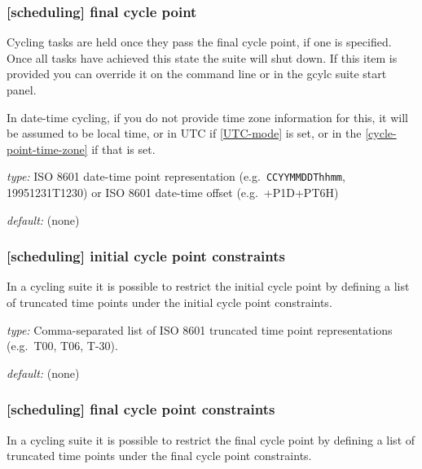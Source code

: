 \subsubsection[final cycle point]{[scheduling] \textrightarrow final cycle point}

Cycling tasks are held once they pass the final cycle point, if one is
specified. Once all tasks have achieved this state the suite will shut
down. If this item is provided you can override it on the command line
or in the gcylc suite start panel.

In date-time cycling, if you do not provide time zone information for this,
it will be assumed to be local time, or in UTC if \ref{UTC-mode} is set, or in
the \ref{cycle-point-time-zone} if that is set.

\begin{myitemize}
    \item {\em type:} ISO 8601 date-time point representation (e.g.\ 
 \lstinline=CCYYMMDDThhmm=, 19951231T1230) or ISO 8601 date-time offset
    (e.g.\  +P1D+PT6H)
    \item {\em default:} (none)
\end{myitemize}

\subsubsection[initial cycle point constraints]{[scheduling] \textrightarrow initial cycle point constraints}
\label{initial cycle point constraints}

In a cycling suite it is possible to restrict the initial cycle point by
defining a list of truncated time points under the initial cycle point
constraints.

\begin{myitemize}
    \item {\em type:} Comma-separated list of ISO 8601 truncated time point
        representations (e.g.\  T00, T06, T-30).
    \item {\em default:} (none)
\end{myitemize}

\subsubsection[final cycle point constraints]{[scheduling] \textrightarrow final cycle point constraints}
\label{final cycle point constraints}

In a cycling suite it is possible to restrict the final cycle point by
defining a list of truncated time points under the final cycle point
constraints.

